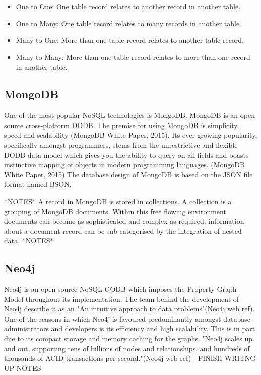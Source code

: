 \begin{itemize}
\item One to One: One table record relates to another record in another table.
\item One to Many: One table record relates to many records in another table.
\item Many to One: More than one table record relates to another table record.
\item Many to Many: More than one table record relates to more than one record in another table.
\end{itemize}

\subsection{MongoDB}\label{mongo}
One of the most popular NoSQL technologies is MongoDB. MongoDB is an open source cross-platform DODB. The premise for using MongoDB is simplicity, speed and scalability (MongoDB White Paper, 2015). Its ever growing popularity, specifically amongst programmers, stems from the unrestrictive and flexible DODB data model which gives you the ability to query on all fields and boasts instinctive mapping of objects in modern programming languages. (MongoDB White Paper, 2015) The database design of MongoDB is based on the JSON file format named BSON.

*NOTES* A record in MongoDB is stored in collections. A collection is a grouping of MongoDB documents.
Within this free flowing environment documents can become as sophisticated and complex as required; information about a document record can be sub categorised by the integration of nested data. *NOTES*

\subsection{Neo4j}\label{neo}
Neo4j is an open-source NoSQL GODB which imposes the Property Graph Model throughout its implementation. The team behind the development of Neo4j describe it as an "An intuitive approach to data problems"(Neo4j web ref). One of the reasons in which Neo4j is favoured predominantly amongst database administrators and developers is its efficiency and high scalability. This is in part due to its compact storage and memory caching for the graphs. "Neo4j scales up and out, supporting tens of billions of nodes and relationships, and hundreds of thousands of ACID transactions per second."(Neo4j web ref) - FINISH WRITNG UP NOTES

